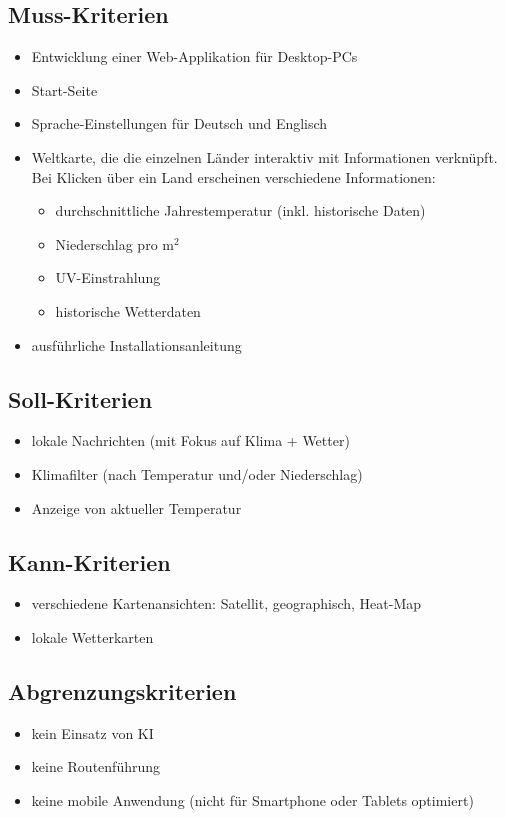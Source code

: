 \documentclass[12pt]{article}
\begin{document}
\subsection*{Muss-Kriterien}
\begin{itemize}
    \item Entwicklung einer Web-Applikation für Desktop-PCs
    \item Start-Seite
    \item Sprache-Einstellungen für Deutsch und Englisch
    \item Weltkarte, die die einzelnen Länder interaktiv mit Informationen verknüpft. Bei Klicken über ein Land erscheinen verschiedene Informationen:
    \begin{itemize}
        \item durchschnittliche Jahrestemperatur (inkl. historische Daten)
        \item Niederschlag pro m$^2$
        \item UV-Einstrahlung
        \item historische Wetterdaten
    \end{itemize}
    \item ausführliche Installationsanleitung
\end{itemize}

\subsection*{Soll-Kriterien}
\begin{itemize}
    \item lokale Nachrichten (mit Fokus auf Klima + Wetter)
    \item Klimafilter (nach Temperatur und/oder Niederschlag)
    \item Anzeige von aktueller Temperatur
\end{itemize}

\subsection*{Kann-Kriterien}
\begin{itemize}
    \item verschiedene Kartenansichten: Satellit, geographisch, Heat-Map
    \item lokale Wetterkarten
\end{itemize}

\subsection*{Abgrenzungskriterien}
\begin{itemize}
    \item kein Einsatz von KI
    \item keine Routenführung
    \item keine mobile Anwendung (nicht für Smartphone oder Tablets optimiert)
\end{itemize}
\end{document}
